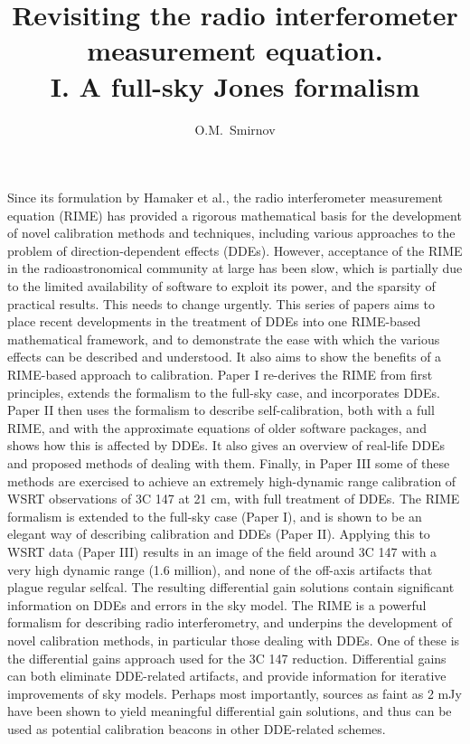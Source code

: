 \documentclass[referee]{aa}
\begin{document}
\title{Revisiting the radio interferometer measurement equation.\\I. A full-sky Jones formalism}

\author{O.M.\ Smirnov}


\date{}


\abstract%
{Since its formulation by Hamaker et al., the radio interferometer measurement equation (RIME) 
has provided a rigorous mathematical basis for the development of novel calibration methods and 
techniques, including various approaches to the problem of direction-dependent effects (DDEs). 
However, acceptance of the RIME in the radioastronomical community at large has been slow, which is
partially due to the limited availability of software to exploit its power, and the sparsity of 
practical results. This needs to change urgently.}
{This series of papers aims to place recent developments in the treatment of DDEs into one 
RIME-based mathematical  framework, and to demonstrate the ease with which the various effects 
can be described and understood. It also aims to show the benefits of a RIME-based approach to calibration.
}
{Paper I re-derives the RIME from first principles, extends the formalism to
the full-sky case, and incorporates DDEs. Paper II then uses the formalism to describe self-calibration, both with 
a full RIME, and with the approximate equations of older software packages, and shows how this is affected 
by DDEs. It also gives an overview of real-life DDEs and proposed methods of dealing with them. Finally, in Paper III 
some of these methods are exercised to achieve an extremely high-dynamic range calibration of WSRT observations of 3C 147 at 21 cm, 
with full treatment of DDEs.
}%
{The RIME formalism is extended to the full-sky case (Paper I), and is shown to be an elegant way of describing calibration and DDEs (Paper II).
Applying this to WSRT data (Paper III) results in an image of the field around 3C 147 with a very high dynamic range (1.6 million), and 
none of the off-axis artifacts that plague regular selfcal. The resulting differential gain solutions contain significant 
information on DDEs and errors in the sky model. 
}%
{The RIME is a powerful formalism for describing radio interferometry, and underpins the development of novel calibration methods,
in particular those dealing with DDEs. One of these is the differential gains approach used for the 3C 147 reduction. Differential 
gains can both eliminate DDE-related artifacts, and provide information for iterative improvements of sky models. 
Perhaps most importantly, sources as faint as 2 mJy have been shown to yield meaningful differential gain solutions, 
and thus can be used as potential calibration beacons in other DDE-related schemes.}
\end{document}
